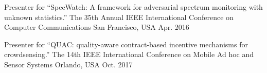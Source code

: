 

\begin{cventries}

  \cventrylong
    {Presenter for ``SpecWatch: A framework for adversarial spectrum
    	monitoring with unknown statistics.''} %
    {The 35th Annual IEEE International Conference on Computer Communications} %
    {San Francisco, USA} %
    {Apr. 2016} %

  \cventrylong
    {Presenter for ``QUAC: quality-aware contract-based incentive mechanisms for crowdsensing.''} %
    {The 14th IEEE International Conference on Mobile Ad hoc and Sensor Systems } %
    {Orlando, USA} %
    {Oct. 2017} %


\end{cventries}
